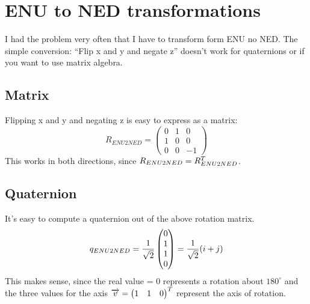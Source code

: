 \section{ENU to NED transformations}
I had the problem very often that I have to transform form ENU no NED. The simple conversion: ``Flip x and y and negate z'' doesn't work for quaternions or if you want to use matrix algebra.

\subsection{Matrix}
Flipping x and y and negating z is easy to express as a matrix:
\begin{equation}
R_{ENU2NED} = \begin{pmatrix}
0 & 1 &  0 \\
1 & 0 &  0 \\
0 & 0 & -1
\end{pmatrix}
\end{equation}
This works in both directions, since $ R_{ENU2NED} = R^{T}_{ENU2NED} $.

\subsection{Quaternion}
It's easy to compute a quaternion out of the above rotation matrix.
\begin{equation}
q_{ENU2NED} = \frac{1}{\sqrt 2} \begin{pmatrix}
0 \\ 1 \\ 1 \\ 0
\end{pmatrix} = \frac{1}{\sqrt 2} (i + j)
\end{equation}
This makes sense, since the real value = 0 represents a rotation about $180^{\circ}$ and the three values for the axis $ \overrightarrow{v} = \begin{pmatrix}1&1&0\end{pmatrix}^{T}$ represent the axis of rotation.

